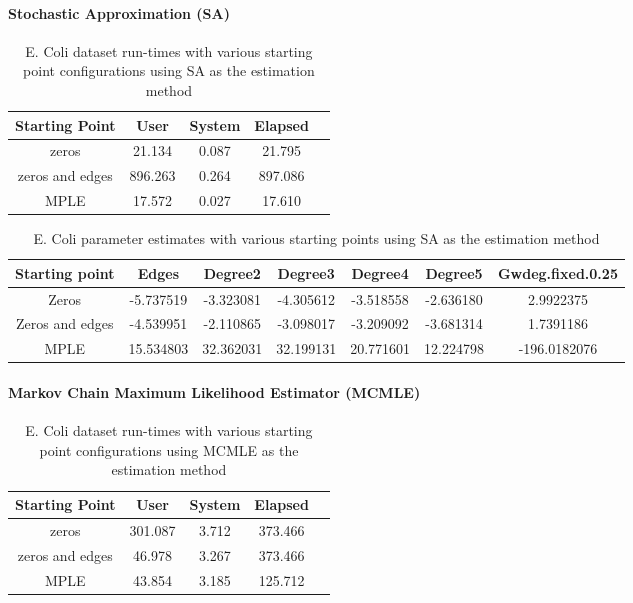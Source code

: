 \paragraph{Stochastic Approximation (SA)}

\begin{table}[H]
\centering
\begin{tabular}{||c | c | c | c | c||}
 \hline
 Starting Point & User & System & Elapsed \\ 
 \hline
 zeros & 21.134 & 0.087 & 21.795 \\
 \hline
 zeros and edges & 896.263 & 0.264 & 897.086 \\ 
 \hline
 MPLE & 17.572 & 0.027 & 17.610 \\
 \hline
 \end{tabular}
 \label{t:ecoli1_sa}
 \caption{E. Coli dataset run-times with various starting point configurations using SA as the estimation method}
 \end{table}

\begin{table}[H]
\centering
\begin{tabular}{|| c | c | c | c | c | c | c ||}
\hline
Starting point & Edges & Degree2 & Degree3 & Degree4 & Degree5 & Gwdeg.fixed.0.25 \\
\hline
Zeros & -5.737519 & -3.323081 & -4.305612 & -3.518558 & -2.636180 & 2.9922375 \\
\hline
Zeros and edges & -4.539951 &-2.110865 & -3.098017 & -3.209092 & -3.681314 & 1.7391186 \\
\hline
MPLE & 15.534803 & 32.362031 & 32.199131 & 20.771601 & 12.224798 & -196.0182076 \\
\hline
\end{tabular}
\label{t:params_ecoli_sa}
\caption{E. Coli parameter estimates with various starting points using SA as the estimation method}
\end{table}

\paragraph{Markov Chain Maximum Likelihood Estimator (MCMLE)}

\begin{table}[H]
\centering
 \begin{tabular}{||c | c | c | c | c||} 
 \hline
 Starting Point & User & System & Elapsed \\ 
 \hline
 zeros & 301.087 & 3.712 & 373.466 \\
 \hline
 zeros and edges & 46.978 & 3.267 & 373.466 \\ 
 \hline
 MPLE & 43.854 & 3.185 & 125.712 \\ 
 \hline
\end{tabular}
\label{t:ecoli1_mcmle}
\caption{E. Coli dataset run-times with various starting point configurations using MCMLE as the estimation method}
\end{table}

